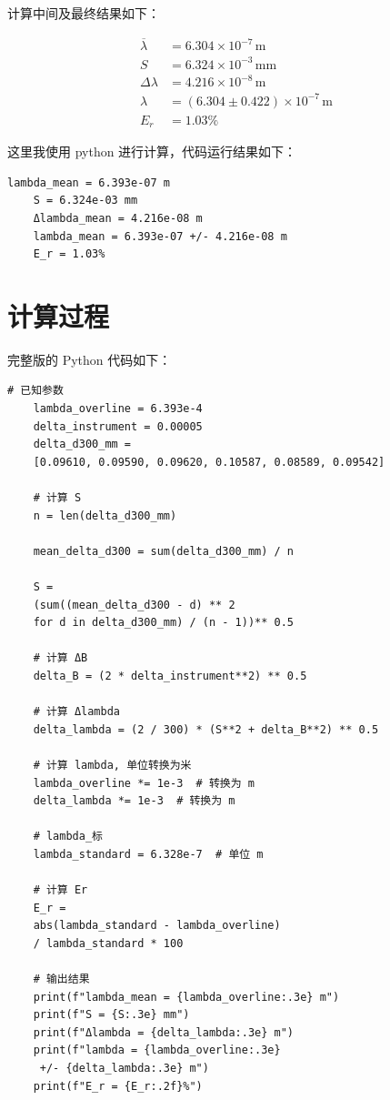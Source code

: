 \documentclass[12pt]{article}
\begin{document}
计算中间及最终结果如下：

\begin{align*}
\overline{\lambda} &= 6.304 \times 10^{-7} \, \text{m} \\
S &= 6.324 \times 10^{-3} \, \text{mm} \\
\Delta \lambda &= 4.216 \times 10^{-8} \, \text{m} \\
\lambda &= (6.304 \pm 0.422) \times 10^{-7} \, \text{m}\\
E_r &= 1.03\%
\end{align*}

这里我使用 python 进行计算，代码运行结果如下：

\begin{Verbatim}[frame=single, fontsize=\small]
    lambda_mean = 6.393e-07 m
    S = 6.324e-03 mm
    Δlambda_mean = 4.216e-08 m
    lambda_mean = 6.393e-07 +/- 4.216e-08 m
    E_r = 1.03%
\end{Verbatim}

\section{\normalfont 计算过程}
完整版的 Python 代码如下：

\begin{Verbatim}[frame=single, fontsize=\small]
    # 已知参数
    lambda_overline = 6.393e-4
    delta_instrument = 0.00005
    delta_d300_mm =
    [0.09610, 0.09590, 0.09620, 0.10587, 0.08589, 0.09542]
    
    # 计算 S
    n = len(delta_d300_mm)

    mean_delta_d300 = sum(delta_d300_mm) / n

    S = 
    (sum((mean_delta_d300 - d) ** 2 
    for d in delta_d300_mm) / (n - 1))** 0.5
    
    # 计算 ΔB
    delta_B = (2 * delta_instrument**2) ** 0.5
    
    # 计算 Δlambda
    delta_lambda = (2 / 300) * (S**2 + delta_B**2) ** 0.5
    
    # 计算 lambda, 单位转换为米
    lambda_overline *= 1e-3  # 转换为 m
    delta_lambda *= 1e-3  # 转换为 m
    
    # lambda_标
    lambda_standard = 6.328e-7  # 单位 m
    
    # 计算 Er
    E_r = 
    abs(lambda_standard - lambda_overline) 
    / lambda_standard * 100
    
    # 输出结果
    print(f"lambda_mean = {lambda_overline:.3e} m")
    print(f"S = {S:.3e} mm")
    print(f"Δlambda = {delta_lambda:.3e} m")
    print(f"lambda = {lambda_overline:.3e}
     +/- {delta_lambda:.3e} m")
    print(f"E_r = {E_r:.2f}%")
    
    
\end{Verbatim}
\end{document}
